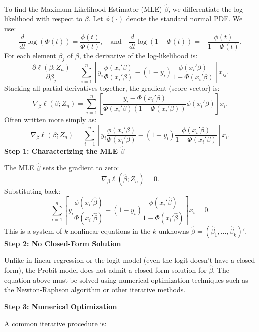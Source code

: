 \documentclass[a4paper,12pt]{article} %
\theoremstyle{nonitalic}
\newenvironment{solution}[1]
  {\renewcommand\theinnercustomsol{#1}\innercustomsol}
  {\endinnercustomsol}
\newcounter{solutionctr}[section]
\renewcommand{\thesolutionctr}{(\alph{solutionctr})}
\newenvironment{autosolution}
  {\stepcounter{solutionctr}\begin{solution}{\thesolutionctr}}
  {\end{solution}}
\begin{document}
\begin{autosolution}
    \
    
    To find the Maximum Likelihood Estimator (MLE) $\hat{\beta}$, we differentiate the log-likelihood with respect to $\beta$. Let $\phi(\cdot)$ denote the standard normal PDF. We use:
    \[
    \frac{d}{dt}\log(\Phi(t)) = \frac{\phi(t)}{\Phi(t)}, \quad \text{and} \quad \frac{d}{dt}\log(1-\Phi(t)) = -\frac{\phi(t)}{1-\Phi(t)}.
    \]
    For each element $\beta_j$ of $\beta$, the derivative of the log-likelihood is:
    \[
    \frac{\partial \ell(\beta;Z_n)}{\partial \beta_j} = \sum_{i=1}^n \left[y_i \frac{\phi(x_i'\beta)}{\Phi(x_i'\beta)} - (1-y_i)\frac{\phi(x_i'\beta)}{1-\Phi(x_i'\beta)}\right]x_{ij}.
    \]
    Stacking all partial derivatives together, the gradient (score vector) is:
    \[
    \nabla_{\beta}\ell(\beta;Z_n) = \sum_{i=1}^n \left[ \frac{y_i - \Phi(x_i'\beta)}{\Phi(x_i'\beta)(1-\Phi(x_i'\beta))} \phi(x_i'\beta) \right] x_i.
    \]
    Often written more simply as:
    \[
    \nabla_{\beta}\ell(\beta;Z_n) = \sum_{i=1}^n \left[ y_i \frac{\phi(x_i'\beta)}{\Phi(x_i'\beta)} - (1-y_i)\frac{\phi(x_i'\beta)}{1-\Phi(x_i'\beta)} \right] x_i.
    \]
    \textbf{Step 1: Characterizing the MLE $\hat{\beta}$}
    
    The MLE $\hat{\beta}$ sets the gradient to zero:
    \[
    \nabla_{\beta}\ell(\hat{\beta};Z_n) = 0.
    \]
    Substituting back:
    \[
    \sum_{i=1}^n \left[ y_i \frac{\phi(x_i'\hat{\beta})}{\Phi(x_i'\hat{\beta})} - (1-y_i)\frac{\phi(x_i'\hat{\beta})}{1-\Phi(x_i'\hat{\beta})} \right] x_i = 0.
    \]
    This is a system of $k$ nonlinear equations in the $k$ unknowns $\hat{\beta} = (\hat{\beta}_1, \ldots, \hat{\beta}_k)'$.
    \textbf{Step 2: No Closed-Form Solution}

    Unlike in linear regression or the logit model (even the logit doesn't have a closed form), the Probit model does not admit a closed-form solution for $\hat{\beta}$. The equation above must be solved using numerical optimization techniques such as the Newton-Raphson algorithm or other iterative methods.

    \textbf{Step 3: Numerical Optimization}

    A common iterative procedure is:

    
    

\end{autosolution}
\end{document}
